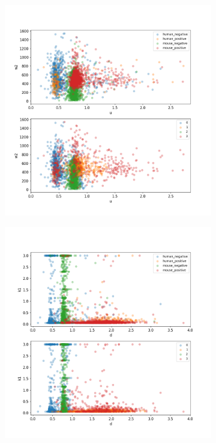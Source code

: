 \begin{figure}
\begin{subfigure}{0.3\textwidth}
	\end{subfigure}
	\hfill
	\begin{subfigure}{0.3\textwidth}
		\includegraphics[width=\textwidth]{fig/seperate_u_w2}
	\end{subfigure}
	\hfill
	\begin{subfigure}{0.3\textwidth}
		\includegraphics[width=\textwidth]{fig/seperate_d_k1}

\end{subfigure}
\end{figure}

